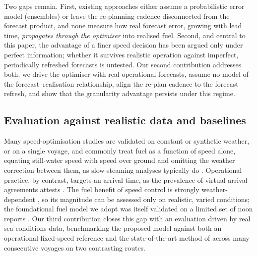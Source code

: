 \documentclass[review,authoryear]{elsarticle}
\begin{document}
Two gaps remain. First, existing approaches either assume a probabilistic error model (ensembles) or
leave the re-planning cadence disconnected from the forecast product, and none measure how real
forecast error, growing with lead time, \emph{propagates through the optimiser} into realised fuel.
Second, and central to this paper, the advantage of a finer speed decision has been argued only under
perfect information; whether it survives realistic operation against imperfect, periodically refreshed
forecasts is untested. Our second contribution addresses both: we drive the optimiser with real
operational forecasts, assume no model of the forecast--realisation relationship, align the re-plan
cadence to the forecast refresh, and show that the granularity advantage persists under this regime.

\subsection{Evaluation against realistic data and baselines}
Many speed-optimisation studies are validated on constant or synthetic weather, or on a single voyage,
and commonly treat fuel as a function of speed alone, equating still-water speed with speed over
ground and omitting the weather correction between them, as slow-steaming analyses typically do
\citep{Cariou2011}. Operational practice, by contrast, targets an arrival time, as the prevalence of
virtual-arrival agreements attests \citep{Jia2017}. The fuel benefit of speed control is strongly weather-dependent
\citep{Taskar2020, Tezdogan2015}, so its magnitude can be assessed only on realistic, varied
conditions; the foundational fuel model we adopt was itself validated on a limited set of noon reports
\citep{yang2020}. Our third contribution closes this gap with an evaluation driven by real
sea-conditions data, benchmarking the proposed model against both an operational fixed-speed reference
and the state-of-the-art method of \citet{luo2024} across many consecutive voyages on two contrasting
routes.
\end{document}
